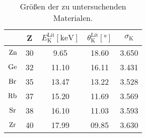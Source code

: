     \begin{table}
        \centering
        \caption{Größen der zu untersuchenden Materialen.}
        \label{tab:Vorbereitung2}
        \begin{tabular}{c c S S S}
            \toprule
            &
            {Z} &
            {$E^\text{Lit}_\text{K} [\si{\kilo\electronvolt}]$} &
            {$\theta^\text{Lit}_\text{K} [\si{\degree}]$} &
            {$\sigma_\text{K}$} \\
            \midrule
            $\ce{Zn}$ & 30 &  9.65 & 18.60 & 3.650 \\
            $\ce{Ge}$ & 32 & 11.10 & 16.11 & 3.431 \\
            $\ce{Br}$ & 35 & 13.47 & 13.22 & 3.528 \\
            $\ce{Rb}$ & 37 & 15.20 & 11.69 & 3.569 \\
            $\ce{Sr}$ & 38 & 16.10 & 11.03 & 3.593 \\
            $\ce{Zr}$ & 40 & 17.99 & 09.85 & 3.630 \\
            \bottomrule
        \end{tabular}
    \end{table}
